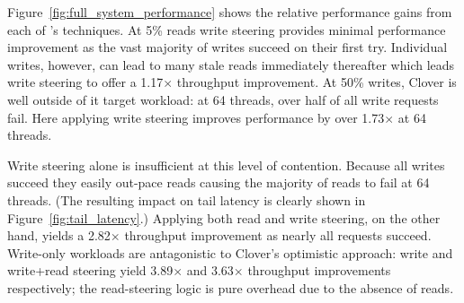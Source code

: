 Figure~\ref{fig:full_system_performance} shows the relative
performance gains from each of \sword's techniques. At 5\% reads write
steering provides minimal performance improvement as the vast majority
of writes succeed on their first try. Individual writes, however, can
lead to many stale reads immediately thereafter which leads write steering
to offer a 1.17$\times$ throughput improvement.
%
%
At 50\% writes, Clover is well outside of it target workload:
at 64 threads, over half of all write requests fail. Here applying write
steering improves performance by over 1.73$\times$ at 64 threads.

Write steering alone is insufficient at this level of contention.
Because all writes succeed they easily out-pace reads causing the
majority of reads to fail at 64 threads.  (The resulting impact on
tail latency is clearly shown in Figure~\ref{fig:tail_latency}.)
Applying both read and write steering, on the other hand, yields a
2.82$\times$ throughput improvement as nearly all requests succeed.
%
%
Write-only workloads are antagonistic to Clover's optimistic
approach: write and write+read steering yield 3.89$\times$ and
3.63$\times$ throughput improvements respectively; the read-steering
logic is pure overhead due to the absence of reads.






